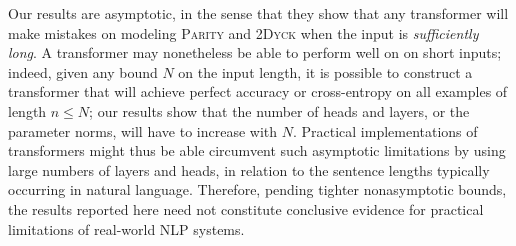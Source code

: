 \documentclass[11pt,a4paper]{article}
\begin{document}
Our results are asymptotic, in the sense that they show that any transformer will make mistakes on modeling \textsc{Parity} and \textsc{2Dyck} when the input is \emph{sufficiently long}.
A transformer may nonetheless be able to perform well on on short inputs; indeed, given any bound $N$ on the input length, it is possible to construct a transformer that will achieve perfect accuracy or cross-entropy on all examples of length $n \leq N$; our results show that the number of heads and layers, or the parameter norms, will have to increase with $N$.
Practical implementations of transformers might thus be able circumvent such asymptotic limitations by using large numbers of layers and heads, in relation to the sentence lengths typically occurring in natural language.
Therefore, pending tighter nonasymptotic bounds, the results reported here need not constitute conclusive evidence for practical limitations of real-world NLP systems.




\end{document}
